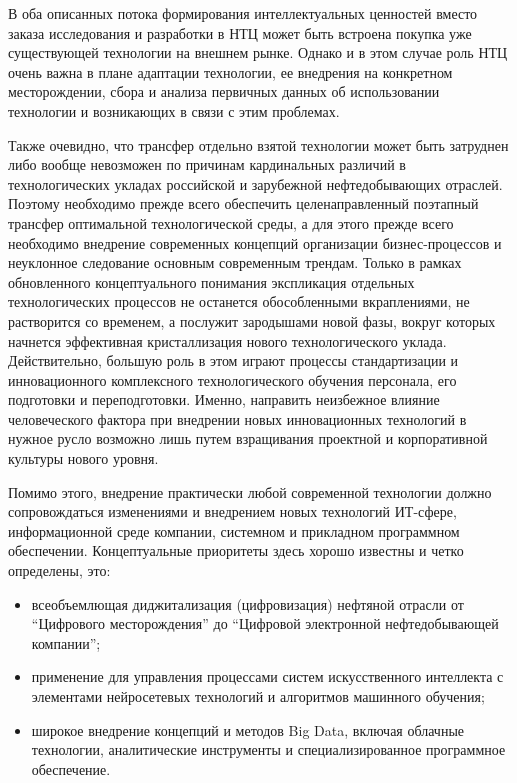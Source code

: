 В оба описанных потока формирования интеллектуальных ценностей вместо заказа исследования и разработки в НТЦ может быть встроена покупка уже существующей технологии на внешнем рынке.
Однако и в этом случае роль НТЦ очень важна в плане адаптации технологии, ее внедрения на конкретном месторождении, сбора и анализа первичных данных об использовании технологии и возникающих в связи с этим проблемах.

Также очевидно, что трансфер отдельно взятой технологии может быть затруднен либо вообще невозможен по причинам кардинальных различий в технологических укладах российской и зарубежной нефтедобывающих отраслей.
Поэтому необходимо прежде всего обеспечить целенаправленный поэтапный трансфер оптимальной технологической среды, а для этого прежде всего необходимо внедрение современных концепций организации бизнес-процессов и неуклонное следование основным современным трендам.
Только в рамках обновленного концептуального понимания экспликация отдельных технологических процессов не останется обособленными вкраплениями, не растворится со временем, а послужит зародышами новой фазы, вокруг которых начнется эффективная кристаллизация нового технологического уклада.
Действительно, большую роль в этом играют процессы стандартизации и инновационного комплексного технологического обучения персонала, его подготовки и переподготовки.
Именно, направить неизбежное влияние человеческого фактора при внедрении новых инновационных технологий в нужное русло возможно лишь путем взращивания проектной и корпоративной культуры нового уровня.

Помимо этого, внедрение практически любой современной технологии должно сопровождаться изменениями и внедрением новых технологий ИТ-сфере, информационной среде компании, системном и прикладном программном обеспечении.
Концептуальные приоритеты здесь хорошо известны и четко определены, это:  
\begin{itemize} 
	\tightlist 
	\item всеобъемлющая диджитализация (цифровизация) нефтяной отрасли от ``Цифрового месторождения'' до ``Цифровой электронной нефтедобывающей компании'';
	\item применение для управления процессами систем искусственного интеллекта с элементами нейросетевых технологий и алгоритмов машинного обучения; 
	\item широкое внедрение концепций и методов Big Data, включая облачные технологии, аналитические инструменты и специализированное программное обеспечение.
\end{itemize}  

